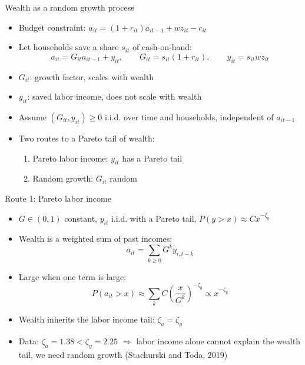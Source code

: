 \documentclass[10pt,english,10pt,handout]{beamer}
\begin{document}
\begin{frame}{Wealth as a random growth process}
\begin{itemize}
\item Budget constraint: $a_{it}=(1+r_{it})a_{it-1}+wz_{it}-c_{it}$
\item Let households save a share $s_{it}$ of cash-on-hand:
\[
a_{it}=G_{it}a_{it-1}+y_{it},\qquad G_{it}=s_{it}(1+r_{it}),\qquad y_{it}=s_{it}wz_{it}
\]
\item $G_{it}$: growth factor, scales with wealth
\item $y_{it}$: saved labor income, does not scale with wealth
\item Assume $(G_{it},y_{it})\geq0$ i.i.d. over time and households, independent of $a_{it-1}$
\item Two routes to a Pareto tail of wealth:
\begin{enumerate}
\item Pareto labor income: $y_{it}$ has a Pareto tail
\item Random growth: $G_{it}$ random
\end{enumerate}
\end{itemize}
\end{frame}

\begin{frame}{Route 1: Pareto labor income}
\begin{itemize}
\item $G\in(0,1)$ constant, $y_{it}$ i.i.d. with a Pareto tail, $P(y>x)\approx Cx^{-\zeta_{y}}$
\item Wealth is a weighted sum of past incomes:
\[
a_{it}=\sum_{k\geq0}G^{k}y_{i,t-k}
\]
\item Large when one term is large:
\[
P(a_{it}>x)\approx\sum_{k}C\left(\frac{x}{G^{k}}\right)^{-\zeta_{y}}\propto x^{-\zeta_{y}}
\]
\item Wealth inherits the labor income tail: $\zeta_{a}=\zeta_{y}$
\item Data: $\zeta_{a}=1.38<\zeta_{y}=2.25$ $\Rightarrow$ labor income alone cannot explain the wealth tail, we need random growth (Stachurski and Toda, 2019)
\end{itemize}
\end{frame}
\end{document}
